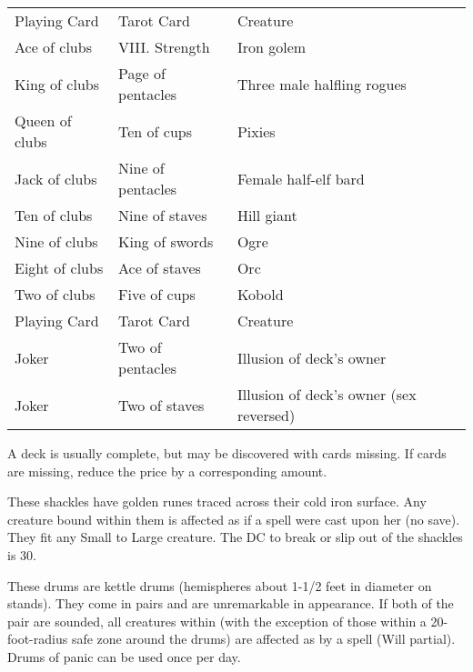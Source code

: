 {\begin{dtable}
\begin{tabularx}{\columnwidth}{l l >{\lcol}X}
Playing Card & Tarot Card & Creature \\
Ace of clubs & VIII. Strength & Iron golem \\
King of clubs & Page of pentacles & Three male halfling rogues \\
Queen of clubs & Ten of cups & Pixies \\
Jack of clubs & Nine of pentacles & Female half-elf bard \\
Ten of clubs & Nine of staves & Hill giant \\
Nine of clubs & King of swords & Ogre \\
Eight of clubs & Ace of staves & Orc \\
Two of clubs & Five of cups & Kobold \\
Playing Card & Tarot Card & Creature \\
Joker & Two of pentacles & Illusion of deck's owner \\
Joker & Two of staves & Illusion of deck's owner (sex reversed)
\end{tabularx}
\end{dtable}

A deck is usually complete, but may be discovered with cards missing. If cards are missing, reduce the price by a corresponding amount.


 These shackles have golden runes traced across their cold iron surface. Any creature bound within them is affected as if a  spell were cast upon her (no save). They fit any Small to Large creature. The DC to break or slip out of the shackles is 30.


 These drums are kettle drums (hemispheres about 1-1/2 feet in diameter on stands). They come in pairs and are unremarkable in appearance. If both of the pair are sounded, all creatures within  (with the exception of those within a 20-foot-radius safe zone around the drums) are affected as by a  spell (Will partial). Drums of panic can be used once per day.


}
